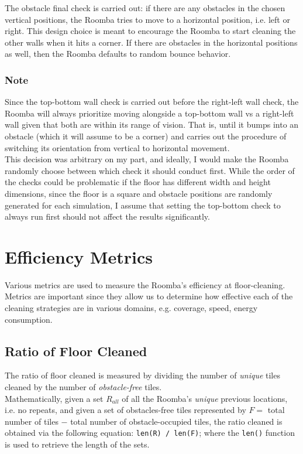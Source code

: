 \documentclass[11pt]{article}
\begin{document}
The obstacle final check is carried out: if there are any obstacles in
the chosen vertical positions, the Roomba tries to move to a horizontal
position, i.e. left or right. This design choice is meant to encourage
the Roomba to start cleaning the other walls when it hits a corner. If
there are obstacles in the horizontal positions as well, then the Roomba
defaults to random bounce behavior.

\subsubsection{Note}

Since the top-bottom wall check is carried out before the right-left
wall check, the Roomba will always prioritize moving alongside a
top-bottom wall vs a right-left wall given that both are within its
range of vision. That is, until it bumps into an obstacle (which it will
assume to be a corner) and carries out the procedure of switching its
orientation from vertical to horizontal movement.\\

This decision was arbitrary on my part, and ideally, I would make the
Roomba randomly choose between which check it should conduct first.
While the order of the checks could be problematic if the floor has
different width and height dimensions, since the floor is a square and
obstacle positions are randomly generated for each simulation, I assume
that setting the top-bottom check to always run first should not affect
the results significantly.
\newpage
\section{Efficiency Metrics}

Various metrics are used to measure the Roomba's efficiency at
floor-cleaning. Metrics are important since they allow us to determine
how effective each of the cleaning strategies are in various domains,
e.g. coverage, speed, energy consumption.

\subsection{Ratio of Floor Cleaned}

The ratio of floor cleaned is measured by dividing the number of
\emph{unique} tiles cleaned by the number of \emph{obstacle-free} tiles.\\

Mathematically, given a set \(R_{all}\) of all the Roomba's
\emph{unique} previous locations, i.e. no repeats, and given a set of
obstacles-free tiles represented by \(F =\) total number of tiles \(-\)
total number of obstacle-occupied tiles, the ratio cleaned is obtained
via the following equation: \texttt{len(R)\ /\ len(F)}; where the
\texttt{len()} function is used to retrieve the length of the sets.\\
\end{document}
